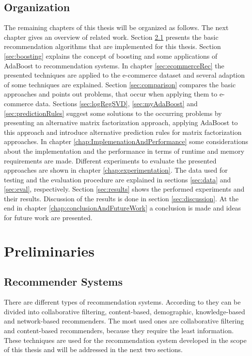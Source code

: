 \documentclass[10pt]{reportMaster}
\begin{document}
\section{Organization}
The remaining chapters of this thesis will be organized as follows.
The next chapter gives an overview of related work.
Section \ref{sec:recommenderSystems} presents the basic recommendation algorithms that are implemented for this thesis.
Section \ref{sec:boosting} explains the concept of boosting and some applications of AdaBoost to recommendation systems.
In chapter \ref{sec:ecommerceRec} the presented techniques are applied to the e-commerce dataset and several adaption of some techniques are explained.
Section \ref{sec:comparison} compares the basic approaches and points out problems, that occur when applying them to e-commerce data.
Sections \ref{sec:logRegSVD}, \ref{sec:myAdaBoost} and \ref{sec:predictionRules} suggest some solutions to the occurring problems by presenting an alternative matrix factorization approach, applying AdaBoost to this approach and introduce alternative prediction rules for matrix factorization approaches. 
In chapter \ref{chap:ImplemenationAndPerformance} some considerations about the implementation and the performance in terms of runtime and memory requirements are made.
Different experiments to evaluate the presented approaches are shown in chapter \ref{chap:experimentation}.
The data used for testing and the evaluation procedure are explained in sections \ref{sec:data} and \ref{sec:eval}, respectively.
Section \ref{sec:results} shows the performed experiments and their results.
Discussion of the results is done in section \ref{sec:discussion}.
At the end in chapter \ref{chap:conclusionAndFutureWork} a conclusion is made and ideas for future work are presented.






\chapter{Preliminaries}
\label{sec:relatedWork}

\section{Recommender Systems}
\label{sec:recommenderSystems}
There are different types of recommendation systems.
According to \cite{hybridSurvey} they can be divided into collaborative filtering, content-based, demographic, knowledge-based and network-based recommenders.
The most used ones are collaborative filtering and content-based recommenders, because they require the least information.
These techniques are used for the recommendation system developed in the scope of this thesis and will be addressed in the next two sections.
\end{document}
